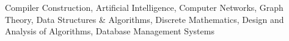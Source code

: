 

\begin{cvskills}

    {Compiler Construction, Artificial Intelligence, Computer Networks,
    Graph Theory, Data Structures \& Algorithms, \newline
    Discrete Mathematics, Design and Analysis of Algorithms,
    Database Management Systems}

\end{cvskills}
